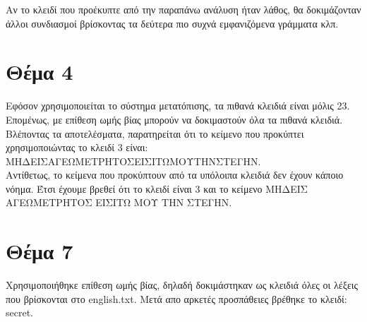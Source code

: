 \documentclass[a4paper, 11pt]{article}
\newcommand{\lt}{\latintext}
\begin{document}
Αν το κλειδί που προέκυπτε από την παραπάνω ανάλυση ήταν λάθος, θα δοκιμάζονταν άλλοι συνδιασμοί βρίσκοντας τα δεύτερα πιο συχνά εμφανιζόμενα γράμματα κλπ.

\section*{Θέμα 4}
Εφόσον χρησιμοποιείται το σύστημα μετατόπισης, τα πιθανά κλειδιά είναι μόλις 23. Επομένως, με επίθεση ωμής βίας μπορούν να
δοκιμαστούν όλα τα πιθανά κλειδιά. Βλέποντας τα αποτελέσματα, παρατηρείται ότι το κείμενο που προκύπτει χρησιμοποιώντας το κλειδί 3 είναι:\\
ΜΗΔΕΙΣΑΓΕΩΜΕΤΡΗΤΟΣΕΙΣΙΤΩΜΟΥΤΗΝΣΤΕΓΗΝ.\\
Αντίθετως, το κείμενα που προκύπτουν από τα υπόλοιπα κλειδιά δεν έχουν κάποιο νόημα. Έτσι έχουμε βρεθεί ότι
το κλειδί είναι 3 και το κείμενο ΜΗΔΕΙΣ ΑΓΕΩΜΕΤΡΗΤΟΣ ΕΙΣΙΤΩ ΜΟΥ ΤΗΝ ΣΤΕΓΗΝ.


\section*{Θέμα 7}
Χρησιμοποιήθηκε επίθεση ωμής βίας, δηλαδή δοκιμάστηκαν ως κλειδιά όλες οι λέξεις που βρίσκονται στο {\lt english.txt}. Μετά απο αρκετές προσπάθειες
βρέθηκε το κλειδί: {\lt secret}.
\end{document}

